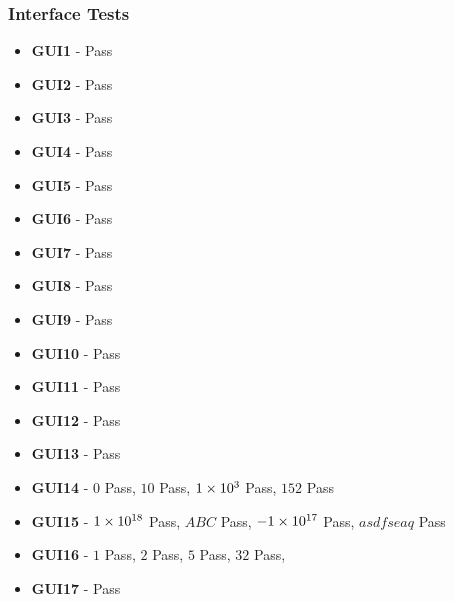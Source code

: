 \subsubsection{Interface Tests}
\begin{itemize}
\footnotesize
\item \textbf{GUI1} - {\color{Green}Pass}
\item \textbf{GUI2} - {\color{Green}Pass}
\item \textbf{GUI3} - {\color{Green}Pass}
\item \textbf{GUI4} - {\color{Green}Pass}
\item \textbf{GUI5} - {\color{Green}Pass}
\item \textbf{GUI6} - {\color{Green}Pass}
\item \textbf{GUI7} - {\color{Green}Pass}
\item \textbf{GUI8} - {\color{Green}Pass}
\item \textbf{GUI9} - {\color{Green}Pass}
\item \textbf{GUI10} - {\color{Green}Pass}
\item \textbf{GUI11} - {\color{Green}Pass}
\item \textbf{GUI12} - {\color{Green}Pass}
\item \textbf{GUI13} - {\color{Green}Pass}
\item \textbf{GUI14} - $0$ {\color{Green}Pass}, $10$ {\color{Green}Pass}, $\num{1E3}$ {\color{Green}Pass}, $152$ {\color{Green}Pass}
\item \textbf{GUI15} - $\num{1E18}$ {\color{Green}Pass}, $ABC$ {\color{Green}Pass}, $\num{-1E17}$ {\color{Green}Pass}, $asdfseaq$ {\color{Green}Pass}
\item \textbf{GUI16} - $1$ {\color{Green}Pass}, $2$ {\color{Green}Pass}, $5$ {\color{Green}Pass}, $32$ {\color{Green}Pass},
\item \textbf{GUI17} - {\color{Green}Pass}
\end{itemize}

